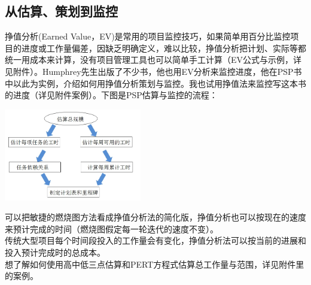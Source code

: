 \hypertarget{ux4eceux4f30ux7b97ux7b56ux5212ux5230ux76d1ux63a7}{%
\subsection{从估算、策划到监控}\label{ux4eceux4f30ux7b97ux7b56ux5212ux5230ux76d1ux63a7}}

挣值分析(Earned Value，EV)是常用的项目监控技巧，如果简单用百分比监控项目的进度或工作量偏差，因缺乏明确定义，难以比较，挣值分析把计划、实际等都统一用成本来计算，没有项目管理工具也可以简单手工计算（EV公式与示例，详见附件）。Humphrey先生出版了不少书，他也用EV分析来监控进度，他在PSP书中以此为实例，介绍如何用挣值分析策划与监控。我也试用挣值法来监控写这本书的进度（详见附件案例）。下图是PSP估算与监控的流程：


\includegraphics[width=6cm]{PSP_fig72-1.jpg}

可以把敏捷的燃烧图方法看成挣值分析法的简化版，挣值分析也可以按现在的速度来预计完成的时间（燃烧图假定每一轮迭代的速度不变）。\\
传统大型项目每个时间段投入的工作量会有变化，挣值分析法可以按当前的进展和投入预计完成时的总成本。\\
想了解如何使用高中低三点估算和PERT方程式估算总工作量与范围，详见附件里的案例。\\



